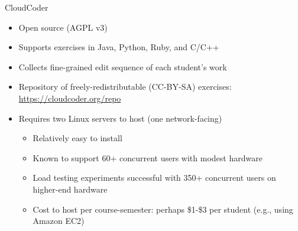 \documentclass{beamer}
\begin{document}
\begin{frame}{CloudCoder}

\begin{itemize}
  \item Open source (AGPL v3)
  \item Supports exercises in Java, Python, Ruby, and C/C++
  \item Collects fine-grained edit sequence of each student's work
  \item Repository of freely-redistributable (CC-BY-SA) exercises:
        \url{https://cloudcoder.org/repo}
  \item Requires two Linux servers to host (one network-facing)
    \begin{itemize}
    \item Relatively easy to install
    \item Known to support 60+ concurrent users with modest hardware
    \item Load testing experiments successful with 350+ concurrent users
          on higher-end hardware
    \item Cost to host per course-semester: perhaps \$1-\$3 per student
          (e.g., using Amazon EC2)
    \end{itemize}
\end{itemize}

\end{frame}

\end{document}

